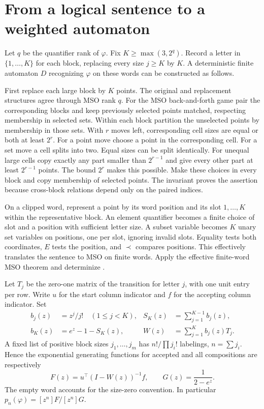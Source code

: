 \documentclass[11pt]{article}
\begin{document}
\section*{From a logical sentence to a weighted automaton}

Let $q$ be the quantifier rank of $\varphi$. Fix $K\ge\max(3,2^q)$. Record a letter in $\{1,\ldots,K\}$ for each block, replacing every size $j\ge K$ by $K$. A deterministic finite automaton $D$ recognizing $\varphi$ on these words can be constructed as follows.

First replace each large block by $K$ points. The original and replacement structures agree through MSO rank $q$. For the MSO back-and-forth game pair the corresponding blocks and keep previously selected points matched, respecting membership in selected sets. Within each block partition the unselected points by membership in those sets. With $r$ moves left, corresponding cell sizes are equal or both at least $2^r$. For a point move choose a point in the corresponding cell. For a set move a cell splits into two. Equal sizes can be split identically. For unequal large cells copy exactly any part smaller than $2^{r-1}$ and give every other part at least $2^{r-1}$ points. The bound $2^r$ makes this possible. Make these choices in every block and copy membership of selected points. The invariant proves the assertion because cross-block relations depend only on the paired indices.

On a clipped word, represent a point by its word position and its slot $1,\ldots,K$ within the representative block. An element quantifier becomes a finite choice of slot and a position with sufficient letter size. A subset variable becomes $K$ unary set variables on positions, one per slot, ignoring invalid slots. Equality tests both coordinates, $E$ tests the position, and $\prec$ compares positions. This effectively translates the sentence to MSO on finite words. Apply the effective finite-word MSO theorem and determinize \cite{elgot}.

Let $T_j$ be the zero-one matrix of the transition for letter $j$, with one unit entry per row. Write $u$ for the start column indicator and $f$ for the accepting column indicator. Set
\[
 \begin{aligned}
 b_j(z)&=z^j/j!\quad(1\le j<K), & S_K(z)&=\sum_{j=1}^{K-1}b_j(z),\\
 b_K(z)&=e^z-1-S_K(z), & W(z)&=\sum_{j=1}^K b_j(z)T_j .
 \end{aligned}
\]
A fixed list of positive block sizes $j_1,\ldots,j_m$ has $n!/\prod j_i!$ labelings, $n=\sum j_i$. Hence the exponential generating functions for accepted and all compositions are respectively
\[
 F(z)=u^\top(I-W(z))^{-1}f,\qquad G(z)=\frac{1}{2-e^z}.
\]
The empty word accounts for the size-zero convention. In particular $p_n(\varphi)=[z^n]F/[z^n]G$.
\end{document}
